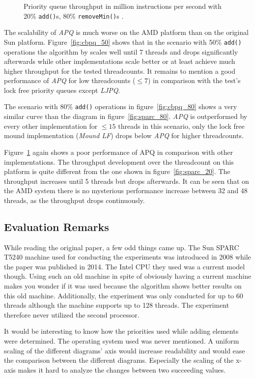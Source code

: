 \begin{figure}[htb]
\begin{minipage}[b]{.495\textwidth}
		\caption{Priority queue throughput in million instructions per second with 20\% \texttt{add()}s, 80\% \texttt{removeMin()}s \cite{braginsky_cbpq:_2016}.}
		\label{fig:cbpq_20}
	\end{minipage}
\end{figure}

The scalability of \textit{APQ} is much worse on the AMD platform than on the original Sun platform. Figure~\ref{fig:cbpq_50} shows that in the scenario with 50\% \texttt{add()} operations the algorithm by \citeauthor{calciu_adaptive_2014} scales well until 7 threads and drops significantly afterwards while other implementations scale better or at least achieve much higher throughput for the tested threadcounts. It remains to mention a good performance of \textit{APQ} for low threadcounts ($\le 7$) in comparison with the test's lock free priority queues except \textit{LJPQ}.

The scenario with 80\% \texttt{add()} operations in figure~\ref{fig:cbpq_80} shows a very similar curve than the diagram in figure~\ref{fig:sparc_80}. \textit{APQ} is outperformed by every other implementation for $\le 15$ threads in this scenario, only the lock free mound implementation (\textit{Mound LF}) drops below \textit{APQ} for higher threadcounts.

Figure~\ref{fig:cbpq_20} again shows a poor performance of APQ in comparison with other implementations. The throughput development over the threadcount on this platform is quite different from the one shown in figure~\ref{fig:sparc_20}. The throughput increases until 5 threads but drops afterwards. It can be seen that on the AMD system there is no mysterious performance increase between 32 and 48 threads, as the throughput drops continuously. 

\subsection{Evaluation Remarks}

While reading the original paper, a few odd things came up. The Sun SPARC T5240 machine used for conducting the experiments was introduced in 2008 while the paper was published in 2014. The Intel CPU they used was a current model though. Using such an old machine in spite of obviously having a current machine makes you wonder if it was used because the algorithm shows better results on this old machine. Additionally, the experiment was only conducted for up to 60 threads although the machine supports up to 128 threads. The experiment therefore never utilized the second processor.

It would be interesting to know how the priorities used while adding elements were determined. The operating system used was never mentioned. A uniform scaling of the different diagrams' axis would increase readability and would ease the comparison between the different diagrams. Especially the scaling of the x-axis makes it hard to analyze the changes between two succeeding values.





